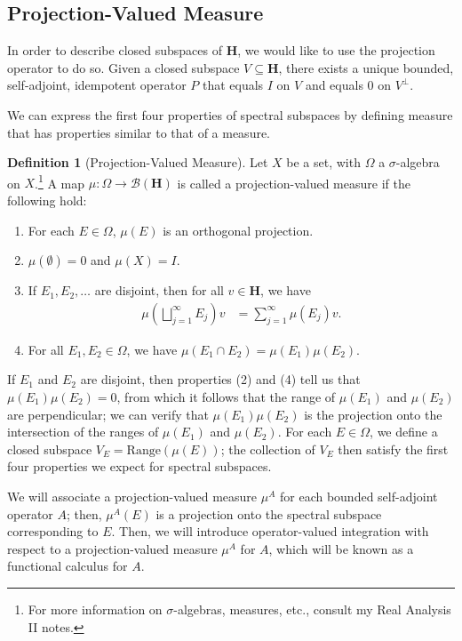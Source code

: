 \documentclass[12pt]{extarticle}
\theoremstyle{plain}
\theoremstyle{definition}
\newtheorem*{definition}{Definition}
\theoremstyle{remark}
\renewcommand{\newline}{\hfill\break}
\begin{document}
  \subsection{Projection-Valued Measure}%
  In order to describe closed subspaces of $\mathbf{H}$, we would like to use the projection operator to do so. Given a closed subspace $V\subseteq \mathbf{H}$, there exists a unique bounded, self-adjoint, idempotent operator $P$ that equals $I$ on $V$ and equals $0$ on $V^{\perp}$.\newline

  We can express the first four properties of spectral subspaces by defining measure that has properties similar to that of a measure.
  \begin{definition}[Projection-Valued Measure]
    Let $X$ be a set, with $\Omega$ a $\sigma$-algebra on $X$.\footnote{For more information on $\sigma$-algebras, measures, etc., consult my Real Analysis II notes.} A map $\mu: \Omega \rightarrow \mathcal{B}\left(\mathbf{H}\right)$ is called a projection-valued measure if the following hold:
        \begin{enumerate}[(1)]
          \item For each $E\in \Omega$, $\mu(E)$ is an orthogonal projection.
          \item $\mu(\emptyset) = 0$ and $\mu(X) = I$.
          \item If $E_1,E_2,\dots$ are disjoint, then for all $v\in \mathbf{H}$, we have
            \begin{align*}
              \mu\left(\bigsqcup_{j=1}^{\infty}E_j\right)v &= \sum_{j=1}^{\infty}\mu(E_j)v.
            \end{align*}
          \item For all $E_1,E_2\in \Omega$, we have $\mu(E_1\cap E_2) = \mu(E_1)\mu(E_2)$.
        \end{enumerate}
  \end{definition}
  If $E_1$ and $E_2$ are disjoint, then properties (2) and (4) tell us that $\mu(E_1)\mu(E_2) = 0$, from which it follows that the range of $\mu(E_1)$ and $\mu(E_2)$ are perpendicular; we can verify that $\mu(E_1)\mu(E_2)$ is the projection onto the intersection of the ranges of $\mu(E_1)$ and $\mu(E_2)$. For each $E\in \Omega$, we define a closed subspace $V_E = \text{Range}(\mu(E))$; the collection of $V_E$ then satisfy the first four properties we expect for spectral subspaces.\newline

  We will associate a projection-valued measure $\mu^{A}$ for each bounded self-adjoint operator $A$; then, $\mu^{A}(E)$ is a projection onto the spectral subspace corresponding to $E$. Then, we will introduce operator-valued integration with respect to a projection-valued measure $\mu^{A}$ for $A$, which will be known as a functional calculus for $A$.\newline
\end{document}
